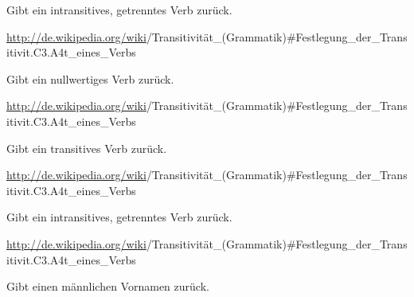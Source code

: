 \documentclass[a4paper,12pt,oneside]{sphinxmanual}
\begin{document}

\begin{fulllineitems}
\label{funktionen:pyzufall.verbi2}
Gibt ein intransitives, getrenntes Verb zurück.

\href{http://de.wikipedia.org/wiki}{http://de.wikipedia.org/wiki}/Transitivität\_(Grammatik)\#Festlegung\_der\_Transitivit.C3.A4t\_eines\_Verbs

\end{fulllineitems}


\begin{fulllineitems}
\label{funktionen:pyzufall.verbn}
Gibt ein nullwertiges Verb zurück.

\href{http://de.wikipedia.org/wiki}{http://de.wikipedia.org/wiki}/Transitivität\_(Grammatik)\#Festlegung\_der\_Transitivit.C3.A4t\_eines\_Verbs

\end{fulllineitems}


\begin{fulllineitems}
\label{funktionen:pyzufall.verbt}
Gibt ein transitives Verb zurück.

\href{http://de.wikipedia.org/wiki}{http://de.wikipedia.org/wiki}/Transitivität\_(Grammatik)\#Festlegung\_der\_Transitivit.C3.A4t\_eines\_Verbs

\end{fulllineitems}


\begin{fulllineitems}
\label{funktionen:pyzufall.verbt2}
Gibt ein intransitives, getrenntes Verb zurück.

\href{http://de.wikipedia.org/wiki}{http://de.wikipedia.org/wiki}/Transitivität\_(Grammatik)\#Festlegung\_der\_Transitivit.C3.A4t\_eines\_Verbs

\end{fulllineitems}


\begin{fulllineitems}
\label{funktionen:pyzufall.vorname_m}
Gibt einen männlichen Vornamen zurück.

\end{fulllineitems}
\end{document}
